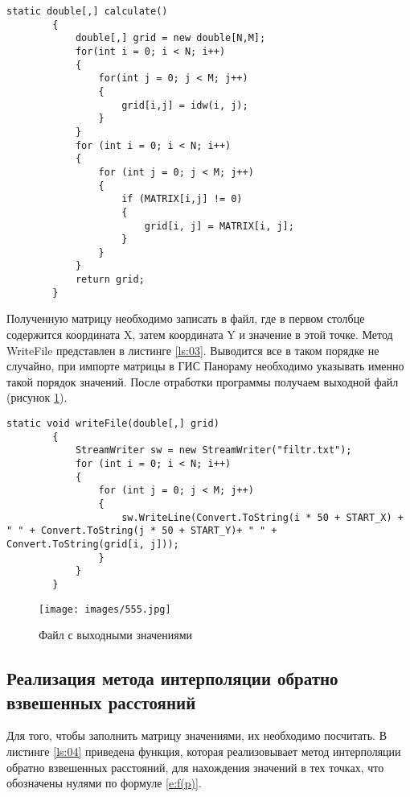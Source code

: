 \begin{lstlisting}[caption={Метод Calculate}, label={ls:02}]
        static double[,] calculate()
        {
            double[,] grid = new double[N,M];
            for(int i = 0; i < N; i++)
            {
                for(int j = 0; j < M; j++)
                {
                    grid[i,j] = idw(i, j);
                }
            }
            for (int i = 0; i < N; i++)
            {
                for (int j = 0; j < M; j++)
                {
                    if (MATRIX[i,j] != 0)
                    {
                        grid[i, j] = MATRIX[i, j];
                    }
                }
            }
            return grid;
        }
\end{lstlisting}

Полученную матрицу необходимо записать в файл, где в первом столбце содержится координата X, затем координата Y и значение в этой точке. Метод WriteFile представлен в листинге \ref{ls:03}. Выводится все в таком порядке не случайно, при импорте матрицы в ГИС Панораму необходимо указывать именно такой порядок значений. После отработки программы получаем выходной файл (рисунок \ref{fig:12}). 


\begin{lstlisting}[caption={Метод WriteFile}, label={ls:03}]
        static void writeFile(double[,] grid)
        {
            StreamWriter sw = new StreamWriter("filtr.txt");
            for (int i = 0; i < N; i++)
            {
                for (int j = 0; j < M; j++)
                {
                    sw.WriteLine(Convert.ToString(i * 50 + START_X) + " " + Convert.ToString(j * 50 + START_Y)+ " " + Convert.ToString(grid[i, j]));
                }
            }
        }
\end{lstlisting}

\begin{figure}[h!]
    \center
    \texttt{[image: images/555.jpg]}
    \caption{Файл с выходными значениями}
    \label{fig:12}
\end{figure}

\subsection{Реализация метода интерполяции обратно взвешенных расстояний}

Для того, чтобы заполнить матрицу значениями, их необходимо посчитать. В листинге \ref{ls:04} приведена функция, которая реализовывает метод интерполяции обратно взвешенных расстояний, для нахождения значений в тех точках, что обозначены нулями по формуле \ref{e:f(p)}. 

